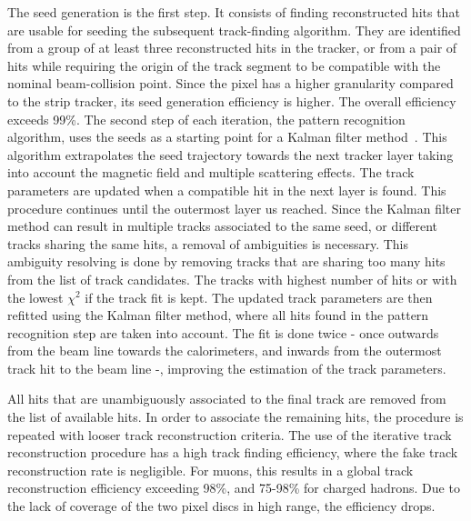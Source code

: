 The seed generation is the first step. It consists of finding reconstructed hits that are usable for seeding the subsequent track-finding algorithm. They are identified from a group of at least three reconstructed hits in the tracker, or from a pair of hits while requiring the origin of the track segment to be compatible with the nominal beam-collision point. Since the pixel has a higher granularity compared to the strip tracker, its seed generation efficiency is higher. The overall efficiency exceeds 99\%.
The second step of each iteration, the pattern recognition algorithm, uses the seeds as a starting point for a Kalman filter method~\cite{FRUHWIRTH1987444,Billoir:1989mh}. This algorithm extrapolates the seed trajectory towards the next tracker layer taking into account the magnetic field and multiple scattering effects. The track parameters are updated when a compatible hit in the next layer is found. This procedure continues until the outermost layer us reached.
Since the Kalman filter method can result in multiple tracks associated to the same seed, or different tracks sharing the same hits, a removal of ambiguities is necessary. This ambiguity resolving is done by removing tracks that are sharing too many hits from the list of track candidates. The tracks with highest number of hits or with the lowest $\chi^2$ if the track fit is kept. 
The updated track parameters are then refitted using the Kalman filter method, where all hits found in the pattern recognition step are taken into account. The fit is done twice - once outwards from the beam line towards the calorimeters, and inwards from the outermost track hit to the beam line -, improving the estimation of the track parameters. 

All hits that are unambiguously associated to the final track are removed from the list of available hits. In order to associate the remaining hits, the procedure is repeated with looser track reconstruction criteria. The use of the iterative track reconstruction procedure has a high track finding efficiency, where the fake track reconstruction rate is negligible. 
For muons, this results in a global track reconstruction efficiency exceeding 98\%, and 75-98\% for charged hadrons. Due to the lack of coverage of the two pixel discs in high \abspsrap range, the efficiency drops. 
